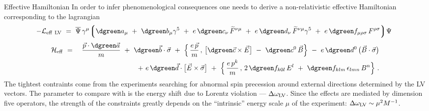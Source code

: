 \documentclass[pdf,PItalk,slideColor,colorBG,accumulate]{prosper}
\newcommand{\myit}{\usefont{T1}{ppl}{m}{it}\fontsize{8pt}{6pt}\selectfont}
\newcommand{\wt}{\widetilde}
\begin{document}

{
\begin{slide}{ Effective Hamiltonian }
\onlyInPS{
\vspace{-0.7cm}
}
	In order to infer phenomenological consequences one needs to
	derive a non-relativistic effective Hamiltonian corresponding
	to the lagrangian
{
    \begin{equation*}
     - \mathcal{L}_{\rm eff~LV}
             ~=~ 
    \overline{\Psi}\, \gamma^\mu \Big\lgroup 
     {\dgreen a_\mu} ~+~ {\dgreen b_\mu} \gamma^5 
    ~+~ e\,{\dgreen c_\nu}\,   \wt{F}^{\nu\mu} 
    ~+~  e\, {\dgreen d_\nu}\,\wt{F}^{\nu\mu} \gamma^5
    ~+~e\, {\dgreen f_{\mu\rho\sigma}}\,  F^{\rho\sigma} 
    \Big\rgroup \Psi~ 
    \end{equation*} 
}
\begin{eqnarray*}
        \mathcal{H}_{\rm eff} 
        & ~=~ &
        \frac{\vec{p} \cdot {\dgreen \vec{a}}}
                  {m}
        ~+~
        {\dgreen \vec{b}} \cdot \vec{\sigma}
        ~+~
        \Big\{\, 
                \frac{e\, \vec{p}}
                    {m}
                \, ,\, 
                \big[ {\dgreen \vec{c}} \times \vec{E} \big]
                ~-~
                {\dgreen c^0}\, \vec{B} 
        \Big\}
        ~-~ 
        e \, {\dgreen d^0} \, \big( \vec{B} \cdot \vec{\sigma} \big)
\nonumber        \\
        & &
        ~+~
        e\, {\dgreen \vec{d}} \cdot
        \big[ \vec{E} \times \vec{\sigma} \big]
        ~+~
        \Big\{\, 
                \frac{e\, p^k}
                    {m}
                \,,\, 
                2\, {\dgreen f_{k0l}}\, E^l 
                ~+~
                {\dgreen f_{klm}} \,\epsilon_{lmn}\, 
                B^n
        \Big\}~. 
\end{eqnarray*}
%
	The tightest contraints come from the experiments searching
	for abnormal spin precession around external directions 
	determined by the LV vectors.
	The parameter to compare with is the energy shift due
	to Lorentz violation --- $\Delta \omega_{\rm LV}$.
	Since the effects are mediated by dimension {\myit five}
	operators, the strength of the constraints greatly depends
	on the ``intrinsic'' energy scale $ \mu $ of the experiment:
$\Delta \omega_{\rm LV} \sim \mu^2 M^{-1}$.
	

\end{slide}}
\end{document}

